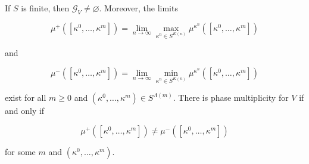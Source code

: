 If $S$ is finite, then $\mathcal{G}_V \neq \varnothing$. Moreover, the limits

$$
\mu^+([\kappa^0, \ldots, \kappa^m]) = \lim_{n \to \infty} \max_{\kappa^n \in S^{K(n)}} \mu^{\kappa^n}([\kappa^0, \ldots, \kappa^m])
$$

and

$$
\mu^-([\kappa^0, \ldots, \kappa^m]) = \lim_{n \to \infty} \min_{\kappa^n \in S^{K(n)}} \mu^{\kappa^n}([\kappa^0, \ldots, \kappa^m])
$$

exist for all $m \geq 0$ and $(\kappa^0, \ldots, \kappa^m) \in S^{\Lambda(m)}$. There is phase multiplicity for $V$ if and only if

$$
\mu^+([\kappa^0, \ldots, \kappa^m]) \neq \mu^-([\kappa^0, \ldots, \kappa^m])
$$

for some $m$ and $(\kappa^0, \ldots, \kappa^m)$.
